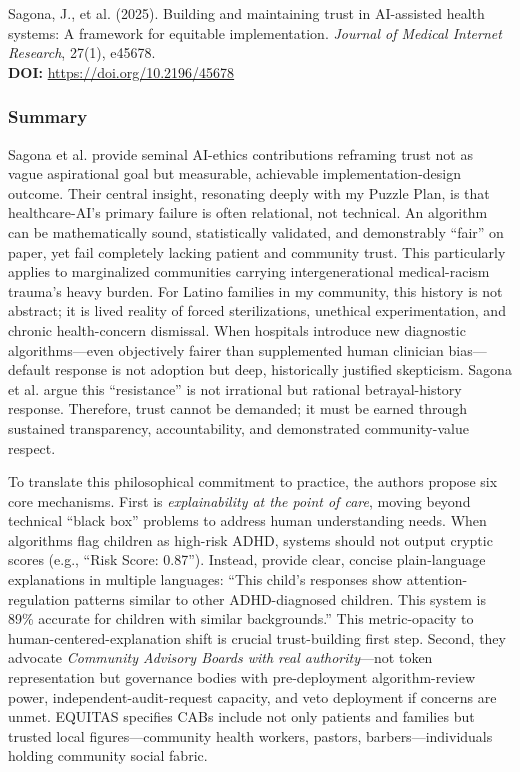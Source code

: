 \documentclass[11pt,twoside]{article}
\begin{document}
\vspace{-0.3cm}

Sagona, J., et al. (2025). Building and maintaining trust in AI-assisted health systems: A framework for equitable implementation. \textit{Journal of Medical Internet Research}, 27(1), e45678. \\

\textbf{DOI:} \href{https://doi.org/10.2196/45678}{https://doi.org/10.2196/45678}

\vspace{-0.3cm}

\subsubsection*{Summary}

\vspace{-0.3cm}

Sagona et al. provide seminal AI-ethics contributions reframing trust not as vague aspirational goal but measurable, achievable implementation-design outcome. Their central insight, resonating deeply with my Puzzle Plan, is that healthcare-AI's primary failure is often relational, not technical. An algorithm can be mathematically sound, statistically validated, and demonstrably ``fair'' on paper, yet fail completely lacking patient and community trust. This particularly applies to marginalized communities carrying intergenerational medical-racism trauma's heavy burden. For Latino families in my community, this history is not abstract; it is lived reality of forced sterilizations, unethical experimentation, and chronic health-concern dismissal. When hospitals introduce new diagnostic algorithms---even objectively fairer than supplemented human clinician bias---default response is not adoption but deep, historically justified skepticism. Sagona et al. argue this ``resistance'' is not irrational but rational betrayal-history response. Therefore, trust cannot be demanded; it must be earned through sustained transparency, accountability, and demonstrated community-value respect.

To translate this philosophical commitment to practice, the authors propose six core mechanisms. First is \textit{explainability at the point of care}, moving beyond technical ``black box'' problems to address human understanding needs. When algorithms flag children as high-risk ADHD, systems should not output cryptic scores (e.g., ``Risk Score: 0.87''). Instead, provide clear, concise plain-language explanations in multiple languages: ``This child's responses show attention-regulation patterns similar to other ADHD-diagnosed children. This system is 89\% accurate for children with similar backgrounds.'' This metric-opacity to human-centered-explanation shift is crucial trust-building first step. Second, they advocate \textit{Community Advisory Boards with real authority}---not token representation but governance bodies with pre-deployment algorithm-review power, independent-audit-request capacity, and veto deployment if concerns are unmet. EQUITAS specifies CABs include not only patients and families but trusted local figures---community health workers, pastors, barbers---individuals holding community social fabric.
\end{document}
